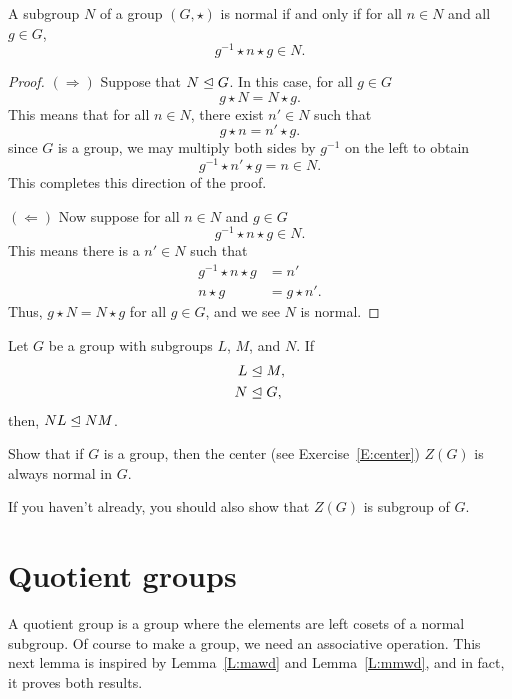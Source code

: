 \documentclass{ximera}
\begin{document}
\begin{lemma}\label{L:nsc}
  A subgroup $N$ of a group $(G,\star)$ is normal if and only if for
  all $n\in N$ and all $g\in G$,
  \[
  g^{-1}\star n\star g\in N.
  \]
  \begin{proof}
    $(\Rightarrow)$ Suppose that $N\trianglelefteq G$. In this case, for all
    $g\in G$
    \[
    g\star N = N\star g.
    \]
    This means that for all $n\in N$, there exist $n'\in N$ such
    that
    \[
    g\star n = n'\star g.
    \]
    since $G$ is a group, we may multiply both sides by $g^{-1}$ on
    the left to obtain
    \[
    g^{-1} \star n' \star g = n\in N.
    \]
    This completes this direction of the proof.

    $(\Leftarrow)$ Now suppose for all $n\in N$ and $g\in G$ 
    \[
    g^{-1}\star n\star g \in N.
    \]
    This means there is a $n'\in N$ such that
    \begin{align*}
      g^{-1}\star n\star g  &= n'\\
      n \star g &= g\star n'.
    \end{align*}
    Thus, $g\star N =N\star g$ for all $g\in G$, and we see $N$ is
    normal.
  \end{proof}
\end{lemma}




\begin{exercise}
  Let $G$ be a group with subgroups $L$, $M$, and $N$. If
  \begin{align*}
    L &\trianglelefteq M,\\
    N &\trianglelefteq G,
  \end{align*}
  then, $NL\trianglelefteq NM$.
\end{exercise}

\begin{exercise}
  Show that if $G$ is a group, then the center (see
  Exercise~\ref{E:center}) $Z(G)$ is always normal in $G$.

  If you haven't already, you should also show that $Z(G)$ is subgroup
  of $G$.
\end{exercise}



\section{Quotient groups}

A quotient group is a group where the elements are left cosets of a
normal subgroup. Of course to make a group, we need an associative
operation.  This next lemma is inspired by Lemma~\ref{L:mawd} and
Lemma~\ref{L:mmwd}, and in fact, it proves both results.
\end{document}
